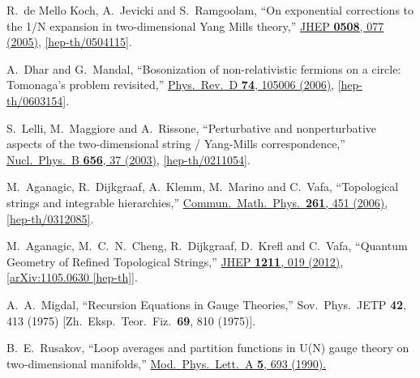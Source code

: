 \documentclass[11pt]{article}
\renewcommand{\[}{\begin{eqnarray}}
\renewcommand{\]}{\end{eqnarray}}
\begin{document}
\begin{thebibliography}{99}
  R.~de Mello Koch, A.~Jevicki and S.~Ramgoolam,
  ``On exponential corrections to the 1/N expansion in two-dimensional Yang Mills theory,''
  \href{http://dx.doi.org/10.1088/1126-6708/2005/08/077}{JHEP {\bf 0508}, 077 (2005)},
  \href{http://arxiv.org/abs/hep-th/050411}{[hep-th/0504115]}.

  A.~Dhar and G.~Mandal,
  ``Bosonization of non-relativistic fermions on a circle: Tomonaga's problem revisited,''
  \href{http://dx.doi.org/10.1103/PhysRevD.74.105006}{Phys.\ Rev.\ D {\bf 74}, 105006 (2006)},
  \href{http://arxiv.org/abs/hep-th/0603154}{[hep-th/0603154]}.

  S.~Lelli, M.~Maggiore and A.~Rissone,
  ``Perturbative and nonperturbative aspects of the two-dimensional string / Yang-Mills correspondence,''
  \href{http://dx.doi.org/10.1016/S0550-3213(03)00102-0}{Nucl.\ Phys.\ B {\bf 656}, 37 (2003)},
  \href{http://arxiv.org/abs/hep-th/0211054}{[hep-th/0211054]}.

  M.~Aganagic, R.~Dijkgraaf, A.~Klemm, M.~Marino and C.~Vafa,
  ``Topological strings and integrable hierarchies,''
  \href{http://dx.doi.org/10.1007/s00220-005-1448-9}{Commun.\ Math.\ Phys.\  {\bf 261}, 451 (2006)},
 \href{http://arxiv.org/abs/hep-th/0312085}{[hep-th/0312085]}.

  M.~Aganagic, M.~C.~N.~Cheng, R.~Dijkgraaf, D.~Krefl and C.~Vafa,
  ``Quantum Geometry of Refined Topological Strings,''
  \href{http://dx.doi.org/10.1007/JHEP11(2012)019}{JHEP {\bf 1211}, 019 (2012)},
  \href{http://arxiv.org/abs/1105.0630}{[arXiv:1105.0630 [hep-th]]}.

  A.~A.~Migdal,
  ``Recursion Equations in Gauge Theories,''
  Sov.\ Phys.\ JETP {\bf 42}, 413 (1975)
  [Zh.\ Eksp.\ Teor.\ Fiz.\  {\bf 69}, 810 (1975)].

  B.~E.~Rusakov,
  ``Loop averages and partition functions in U(N) gauge theory on two-dimensional manifolds,''
  \href{http://dx.doi.org/10.1142/S0217732390000780}{Mod.\ Phys.\ Lett.\ A {\bf 5}, 693 (1990).}


\end{thebibliography}
\end{document}
